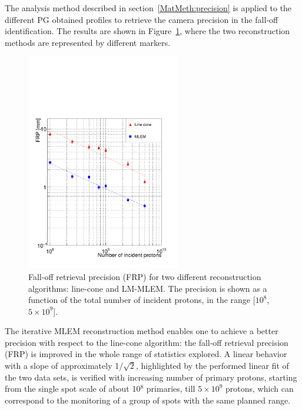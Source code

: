 The analysis method described in section~\ref{MatMeth:precision} is applied to the different PG obtained profiles to retrieve the camera precision in the fall-off identification. The results are shown in Figure~\ref{fig:precision}, where the two reconstruction methods are represented by different markers.

\begin{figure}	
\centering
\includegraphics[width=0.6\textwidth]{./Figure/precision_LC_MLEM.pdf}
\caption{Fall-off retrieval precision (FRP) for two different reconstruction algorithms: line-cone and LM-MLEM. The precision is shown as a function of the total number of incident protons, in the range [$10^{8}$, $5\times10^{9}$].}	
\label{fig:precision}
\end{figure}

The iterative MLEM reconstruction method enables one to achieve a better precision with respect to the line-cone algorithm: the fall-off retrieval precision (FRP) is improved in the whole range of statistics explored. A linear behavior with a slope of approximately 1/$\mathrm{\sqrt{2}}$, highlighted by the performed linear fit of the two data sets, is verified with increasing number of primary protons, starting from the single spot scale of about 10$^8$ primaries, till $5\times10^9$ protons, which can correspond to the monitoring of a group of spots with the same planned range. 

